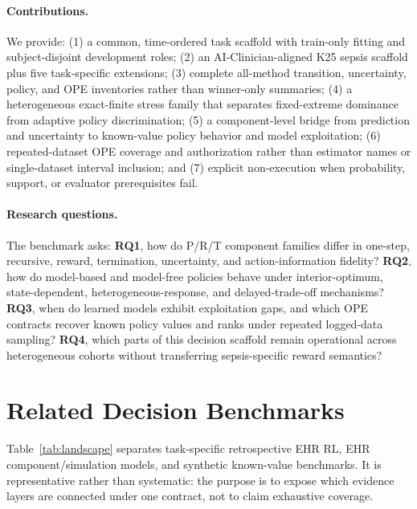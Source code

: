 \documentclass[sigconf,review]{acmart}
\begin{document}
\paragraph{Contributions.}
We provide: (1) a common, time-ordered task scaffold with train-only fitting and subject-disjoint development roles; (2) an AI-Clinician-aligned K25 sepsis scaffold plus five task-specific extensions; (3) complete all-method transition, uncertainty, policy, and OPE inventories rather than winner-only summaries; (4) a heterogeneous exact-finite stress family that separates fixed-extreme dominance from adaptive policy discrimination; (5) a component-level bridge from prediction and uncertainty to known-value policy behavior and model exploitation; (6) repeated-dataset OPE coverage and authorization rather than estimator names or single-dataset interval inclusion; and (7) explicit non-execution when probability, support, or evaluator prerequisites fail.

\paragraph{Research questions.}
The benchmark asks: \textbf{RQ1}, how do P/R/T component families differ in one-step, recursive, reward, termination, uncertainty, and action-information fidelity? \textbf{RQ2}, how do model-based and model-free policies behave under interior-optimum, state-dependent, heterogeneous-response, and delayed-trade-off mechanisms? \textbf{RQ3}, when do learned models exhibit exploitation gaps, and which OPE contracts recover known policy values and ranks under repeated logged-data sampling? \textbf{RQ4}, which parts of this decision scaffold remain operational across heterogeneous cohorts without transferring sepsis-specific reward semantics?

\section{Related Decision Benchmarks}

Table~\ref{tab:landscape} separates task-specific retrospective EHR RL, EHR component/simulation models, and synthetic known-value benchmarks. It is representative rather than systematic: the purpose is to expose which evidence layers are connected under one contract, not to claim exhaustive coverage.
\end{document}
